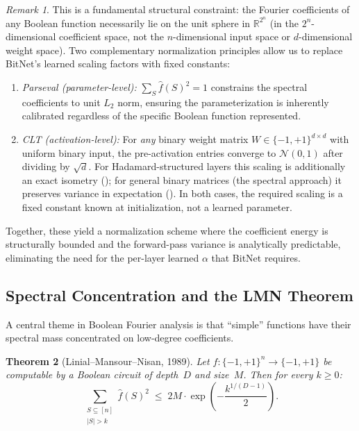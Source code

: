\documentclass[12pt,a4paper]{article}
\theoremstyle{plain}
\newtheorem{theorem}{Theorem}[section]
\theoremstyle{definition}
\theoremstyle{remark}
\newtheorem{remark}[theorem]{Remark}
\newcommand{\R}{\mathbb{R}}
\newcommand{\pmone}{\{-1,+1\}}
\newcommand{\fhat}{\widehat{f}}
\begin{document}
\begin{remark}\label{rem:scaling}
This is a fundamental structural constraint: the Fourier coefficients of any Boolean function necessarily lie on the unit sphere in $\R^{2^n}$ (in the $2^n$-dimensional coefficient space, not the $n$-dimensional input space or $d$-dimensional weight space). Two complementary normalization principles allow us to replace BitNet's learned scaling factors with fixed constants:
\begin{enumerate}[label=(\roman*)]
    \item \emph{Parseval (parameter-level):} $\sum_S \fhat(S)^2 = 1$ constrains the spectral coefficients to unit $L_2$ norm, ensuring the parameterization is inherently calibrated regardless of the specific Boolean function represented.
    \item \emph{CLT (activation-level):} For \emph{any} binary weight matrix $W \in \pmone^{d \times d}$ with uniform binary input, the pre-activation entries converge to $\mathcal{N}(0,1)$ after dividing by $\sqrt{d}$. For Hadamard-structured layers this scaling is additionally an exact isometry (); for general binary matrices (the spectral approach) it preserves variance in expectation (). In both cases, the required scaling is a fixed constant known at initialization, not a learned parameter.
\end{enumerate}
Together, these yield a normalization scheme where the coefficient energy is structurally bounded and the forward-pass variance is analytically predictable, eliminating the need for the per-layer learned $\alpha$ that BitNet requires.
\end{remark}


\subsection{Spectral Concentration and the LMN Theorem}\label{sec:lmn}

A central theme in Boolean Fourier analysis is that ``simple'' functions have their spectral mass concentrated on low-degree coefficients.

\begin{theorem}[Linial--Mansour--Nisan, 1989]\label{thm:lmn}
Let $f \colon \pmone^n \to \pmone$ be computable by a Boolean circuit of depth~$D$ and size~$M$. Then for every $k \geq 0$:
\begin{equation}\label{eq:lmn}
    \sum_{\substack{S \subseteq [n] \\ |S| > k}} \fhat(S)^2 \;\leq\; 2M \cdot \exp\!\left(-\frac{k^{1/(D-1)}}{2}\right).
\end{equation}
\end{theorem}
\end{document}
